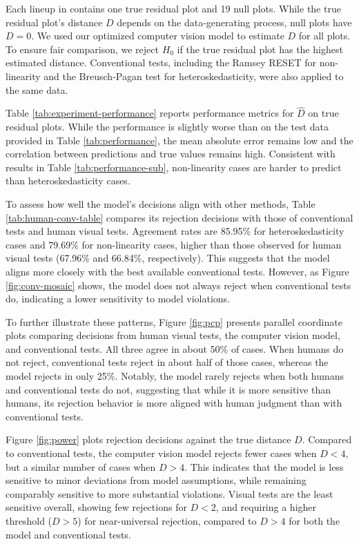 \documentclass[]{interact}
\theoremstyle{plain}%
\theoremstyle{definition}
\theoremstyle{remark}
\begin{document}
Each lineup in \citet{li2024plot} contains one true residual plot and 19
null plots. While the true residual plot's distance \(D\) depends on the
data-generating process, null plots have \(D = 0\). We used our
optimized computer vision model to estimate \(D\) for all plots. To
ensure fair comparison, we reject \(H_0\) if the true residual plot has
the highest estimated distance. Conventional tests, including the Ramsey
RESET \citep{ramsey1969tests} for non-linearity and the Breusch-Pagan
test \citep{breusch1979simple} for heteroskedasticity, were also applied
to the same data.

Table \ref{tab:experiment-performance} reports performance metrics for
\(\hat{D}\) on true residual plots. While the performance is slightly
worse than on the test data provided in Table \ref{tab:performance}, the
mean absolute error remains low and the correlation between predictions
and true values remains high. Consistent with results in Table
\ref{tab:performance-sub}, non-linearity cases are harder to predict
than heteroskedasticity cases.

To assess how well the model's decisions align with other methods, Table
\ref{tab:human-conv-table} compares its rejection decisions with those
of conventional tests and human visual tests. Agreement rates are
85.95\% for heteroskedasticity cases and 79.69\% for non-linearity
cases, higher than those observed for human visual tests (67.96\% and
66.84\%, respectively). This suggests that the model aligns more closely
with the best available conventional tests. However, as Figure
\ref{fig:conv-mosaic} shows, the model does not always reject when
conventional tests do, indicating a lower sensitivity to model
violations.

To further illustrate these patterns, Figure \ref{fig:pcp} presents
parallel coordinate plots comparing decisions from human visual tests,
the computer vision model, and conventional tests. All three agree in
about 50\% of cases. When humans do not reject, conventional tests
reject in about half of those cases, whereas the model rejects in only
25\%. Notably, the model rarely rejects when both humans and
conventional tests do not, suggesting that while it is more sensitive
than humans, its rejection behavior is more aligned with human judgment
than with conventional tests.

Figure \ref{fig:power} plots rejection decisions against the true
distance \(D\). Compared to conventional tests, the computer vision
model rejects fewer cases when \(D < 4\), but a similar number of cases
when \(D > 4\). This indicates that the model is less sensitive to minor
deviations from model assumptions, while remaining comparably sensitive
to more substantial violations. Visual tests are the least sensitive
overall, showing few rejections for \(D < 2\), and requiring a higher
threshold (\(D > 5\)) for near-universal rejection, compared to
\(D > 4\) for both the model and conventional tests.
\end{document}
